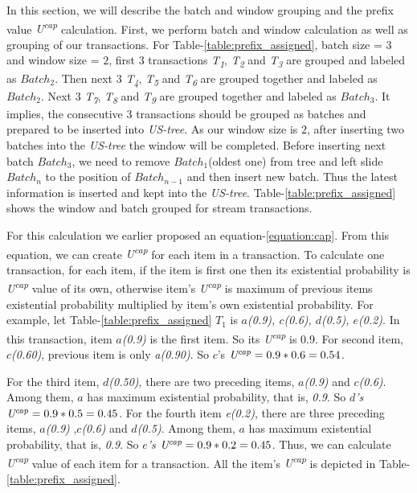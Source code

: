 \documentclass[conference]{IEEEtran}
\begin{document}
In this section, we will describe the batch and window grouping and the prefix value \emph{U\textsuperscript{cap}} calculation. First, we perform batch and window calculation as well as grouping of our transactions. For Table-\ref{table:prefix_assigned}, batch size = \emph{$3$} and window size = \emph{$2$}, first \emph{$3$} transactions \emph{T\textsubscript{1}}, \emph{T\textsubscript{2}} and \emph{T\textsubscript{3}} are grouped and labeled as $Batch_{2}$. Then next \emph{$3$} \emph{T\textsubscript{4}}, \emph{T\textsubscript{5}} and \emph{T\textsubscript{6}} are grouped together and labeled as $Batch_{2}$. Next \emph{$3$} \emph{T\textsubscript{7}}, \emph{T\textsubscript{8}} and \emph{T\textsubscript{9}} are grouped together and labeled as $Batch_{3}$. It implies, the consecutive  \emph{$3$} transactions should be grouped as batches and prepared to be inserted into \emph{US-tree}. As our window size is $2$, after inserting two batches into the \emph{US-tree} the window will be completed. Before inserting next batch $Batch_{3}$, we need to remove $Batch_{1}$(oldest one) from tree and left slide $Batch_{n}$ to the position of $Batch_{n-1}$ and then insert new batch. Thus the latest information is inserted and kept into the \emph{US-tree}. Table-\ref{table:prefix_assigned} shows the window and batch grouped for stream transactions.

For this calculation we earlier proposed an equation-\ref{equation:cap}. From this equation, we can create \emph{U\textsuperscript{cap}} for each item in a transaction. To calculate one transaction, for each item, if the item is first one then its existential probability is \emph{U\textsuperscript{cap}} value of its own, otherwise item's \emph{U\textsuperscript{cap}} is maximum of previous items existential probability multiplied by item's own existential probability. For example, let Table-\ref{table:prefix_assigned} $T_{1}$ is \emph{$a$(0.9), $c$(0.6), $d$(0.5), $e$(0.2)}. In this transaction, item \emph{$a$(0.9)} is the first item. So its \emph{U\textsuperscript{cap}} is 0.9. For second item, \emph{$c$(0.60)}, previous item is only \emph{a(0.90)}. So $c$'s $\emph{U\textsuperscript{cap}} = 0.9*0.6 = 0.54$.

For the third item, \emph{$d$(0.50)}, there are two preceding items, \emph{$a$(0.9)} and \emph{$c$(0.6)}. Among them, \emph{$a$} has maximum existential probability, that is, \emph{0.9}. So \emph{$d$'s} $\emph{U\textsuperscript{cap}} = 0.9*0.5 = 0.45$. For the fourth item \emph{e(0.2)}, there are three preceding items, \emph{$a$(0.9)} ,\emph{$c$(0.6)} and \emph{$d$(0.5)}. Among them, \emph{$a$} has maximum existential probability, that is, \emph{0.9}. So \emph{$e$'s} $\emph{U\textsuperscript{cap}} = 0.9*0.2 = 0.45$. Thus, we can calculate \emph{U\textsuperscript{cap}} value of each item for a transaction. All the item's \emph{U\textsuperscript{cap}} is depicted in Table-\ref{table:prefix_assigned}.
\end{document}
